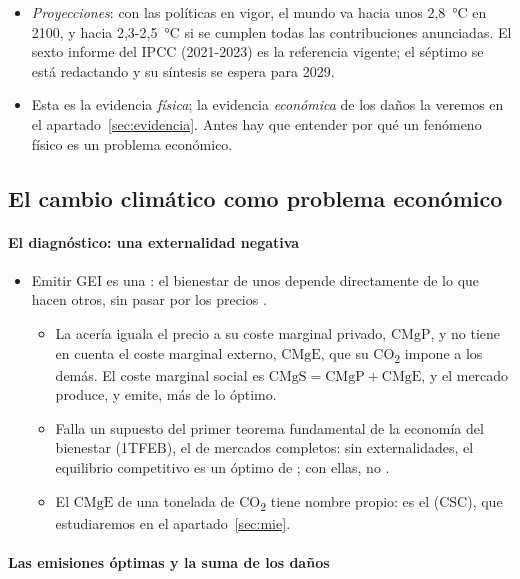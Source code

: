 \documentclass[11pt]{article}
\begin{document}
\begin{itemize}
\item \emph{Proyecciones}: con las políticas en vigor, el mundo va hacia unos 2,8~°C en 2100, y hacia 2,3-2,5~°C si se cumplen todas las contribuciones anunciadas\nocite{UNEP2025Emissions}. El sexto informe del IPCC (2021-2023) es la referencia vigente; el séptimo se está redactando y su síntesis se espera para 2029.
\item Esta es la evidencia \emph{física}; la evidencia \emph{económica} de los daños la veremos en el apartado~\ref{sec:evidencia}. Antes hay que entender por qué un fenómeno físico es un problema económico.
\end{itemize}

\subsection{El cambio climático como problema económico}\label{sec:problema-economico}

\paragraph{El diagnóstico: una externalidad negativa}

\begin{itemize}
\item Emitir GEI es una : el bienestar de unos depende directamente de lo que hacen otros, sin pasar por los precios .
  \begin{itemize}
  \item La acería iguala el precio a su coste marginal privado, $\mathrm{CMgP}$, y no tiene en cuenta el coste marginal externo, $\mathrm{CMgE}$, que su CO\textsubscript{2} impone a los demás. El coste marginal social es $\mathrm{CMgS}=\mathrm{CMgP}+\mathrm{CMgE}$, y el mercado produce, y emite, más de lo óptimo.
  \item Falla un supuesto del primer teorema fundamental de la economía del bienestar (1TFEB), el de mercados completos: sin externalidades, el equilibrio competitivo es un óptimo de ; con ellas, no .
  \item El $\mathrm{CMgE}$ de una tonelada de CO\textsubscript{2} tiene nombre propio: es el  (CSC), que estudiaremos en el apartado~\ref{sec:mie}.
  \end{itemize}
\end{itemize}

\paragraph{Las emisiones óptimas y la suma de los daños}
\end{document}
